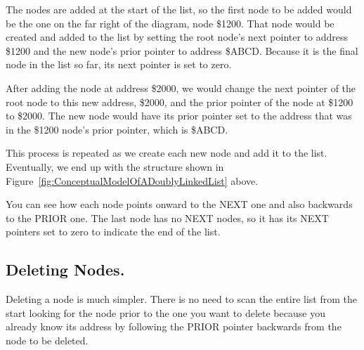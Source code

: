 The nodes are added at the start of the list, so the first node to be added would be the one on the far right of the diagram, node \$1200. That node would be created and added to the list by setting the root node's next pointer to address \$1200 and the new node's prior pointer to address \$ABCD. Because it is the final node in the list so far, its next pointer is set to zero.

After adding the node at address \$2000, we would change the next pointer of the root node to this new address, \$2000, and the prior pointer of the node at \$1200 to \$2000. The new node would have its prior pointer set to the address that was in the \$1200 node's prior pointer, which is \$ABCD.

This process is repeated as we create each new node and add it to the list. Eventually, we end up with the structure shown in Figure~\ref{fig:ConceptualModelOfADoublyLinkedList} above.

You can see how each node points onward to the NEXT one and also
      backwards to the PRIOR one. The last node has no NEXT nodes, so it has
      its NEXT pointers set to zero to indicate the end of the list.

\subsection{Deleting Nodes.}
\label{ch10-dbl-deleteing-nodes}%

Deleting a node is much simpler. There is no need to scan the
      entire list from the start looking for the node prior to the one you
      want to delete because you already know its address by following the
      PRIOR pointer backwards from the node to be deleted.

